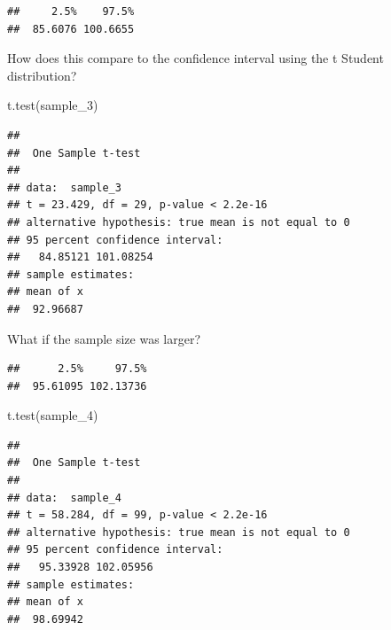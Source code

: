 \documentclass[
]{book}
\newenvironment{Shaded}{\begin{snugshade}}{\end{snugshade}}
\newcommand{\AttributeTok}[1]{\textcolor[rgb]{0.77,0.63,0.00}{#1}}
\newcommand{\DecValTok}[1]{\textcolor[rgb]{0.00,0.00,0.81}{#1}}
\newcommand{\FunctionTok}[1]{\textcolor[rgb]{0.00,0.00,0.00}{#1}}
\newcommand{\NormalTok}[1]{#1}
\newcommand{\OtherTok}[1]{\textcolor[rgb]{0.56,0.35,0.01}{#1}}
\newcommand{\SpecialCharTok}[1]{\textcolor[rgb]{0.00,0.00,0.00}{#1}}
\begin{document}
\begin{verbatim}
##     2.5%    97.5% 
##  85.6076 100.6655
\end{verbatim}

How does this compare to the confidence interval using the t Student distribution?

\begin{Shaded}
\begin{Highlighting}[]
\FunctionTok{t.test}\NormalTok{(sample\_3)}
\end{Highlighting}
\end{Shaded}

\begin{verbatim}
## 
##  One Sample t-test
## 
## data:  sample_3
## t = 23.429, df = 29, p-value < 2.2e-16
## alternative hypothesis: true mean is not equal to 0
## 95 percent confidence interval:
##   84.85121 101.08254
## sample estimates:
## mean of x 
##  92.96687
\end{verbatim}

What if the sample size was larger?

\begin{Shaded}
\end{Shaded}

\begin{verbatim}
##      2.5%     97.5% 
##  95.61095 102.13736
\end{verbatim}

\begin{Shaded}
\begin{Highlighting}[]
\FunctionTok{t.test}\NormalTok{(sample\_4)}
\end{Highlighting}
\end{Shaded}

\begin{verbatim}
## 
##  One Sample t-test
## 
## data:  sample_4
## t = 58.284, df = 99, p-value < 2.2e-16
## alternative hypothesis: true mean is not equal to 0
## 95 percent confidence interval:
##   95.33928 102.05956
## sample estimates:
## mean of x 
##  98.69942
\end{verbatim}
\end{document}
